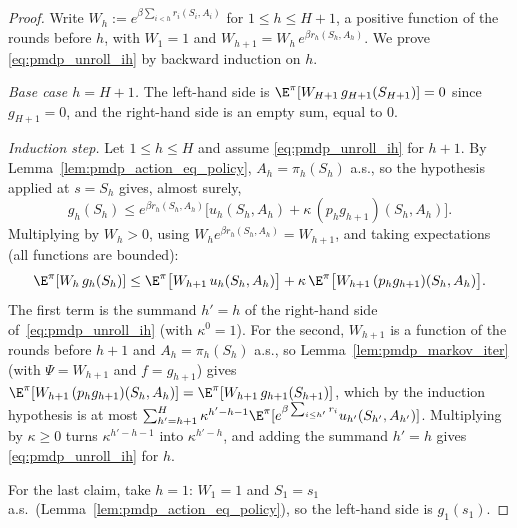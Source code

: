 \begin{proof}
\leanok
Write $W_h := e^{\beta\sum_{i < h} r_i(S_i, A_i)}$ for $1 \le h \le H + 1$, a positive function
of the rounds before $h$, with $W_1 = 1$ and $W_{h+1} = W_h\,e^{\beta r_h(S_h, A_h)}$. We prove
\eqref{eq:pmdp_unroll_ih} by backward induction on $h$.

\emph{Base case $h = H + 1$.} The left-hand side is $\E^\pi[W_{H+1}\,g_{H+1}(S_{H+1})] = 0$
since $g_{H+1} = 0$, and the right-hand side is an empty sum, equal to $0$.

\emph{Induction step.} Let $1 \le h \le H$ and assume \eqref{eq:pmdp_unroll_ih} for $h + 1$.
By Lemma~\ref{lem:pmdp_action_eq_policy}, $A_h = \pi_h(S_h)$ a.s., so the hypothesis applied at
$s = S_h$ gives, almost surely,
\[
  g_h(S_h) \le e^{\beta r_h(S_h, A_h)}\Big[u_h(S_h, A_h) + \kappa\,(p_h g_{h+1})(S_h, A_h)\Big] .
\]
Multiplying by $W_h > 0$, using $W_h e^{\beta r_h(S_h,A_h)} = W_{h+1}$, and taking expectations
(all functions are bounded):
\[
  \E^\pi[W_h\,g_h(S_h)] \le \E^\pi\big[W_{h+1}\,u_h(S_h, A_h)\big]
  + \kappa\,\E^\pi\big[W_{h+1}\,(p_h g_{h+1})(S_h, A_h)\big] .
\]
The first term is the summand $h' = h$ of the right-hand side of~\eqref{eq:pmdp_unroll_ih}
(with $\kappa^0 = 1$). For the second, $W_{h+1}$ is a function of the rounds before $h + 1$
and $A_h = \pi_h(S_h)$ a.s., so Lemma~\ref{lem:pmdp_markov_iter} (with $\Psi = W_{h+1}$ and
$f = g_{h+1}$) gives $\E^\pi[W_{h+1}\,(p_h g_{h+1})(S_h, A_h)] = \E^\pi[W_{h+1}\,g_{h+1}(S_{h+1})]$,
which by the induction hypothesis is at most
$\sum_{h' = h+1}^{H}\kappa^{h' - h - 1}\E^\pi[e^{\beta\sum_{i \le h'} r_i}u_{h'}(S_{h'},A_{h'})]$.
Multiplying by $\kappa \ge 0$ turns $\kappa^{h' - h - 1}$ into $\kappa^{h' - h}$, and adding the
summand $h' = h$ gives \eqref{eq:pmdp_unroll_ih} for $h$.

For the last claim, take $h = 1$: $W_1 = 1$ and $S_1 = s_1$ a.s.\ (Lemma~\ref{lem:pmdp_action_eq_policy}),
so the left-hand side is $g_1(s_1)$.
\end{proof}


